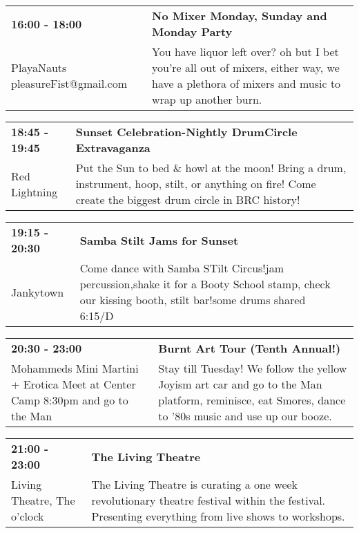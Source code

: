 \begin{tabular}{ p{1in} p{2.2in} }
    \textbf{16:00 - 18:00} & \textbf{No Mixer Monday, Sunday and Monday Party} \\
    PlayaNauts \newline pleasureFist@gmail.com & You have liquor left over? oh but I bet you're all out of mixers, either way, we have a plethora of mixers and music to wrap up another burn. \\
    \hline 
\end{tabular}
    
\begin{tabular}{ p{1in} p{2.2in} }
    \textbf{18:45 - 19:45} & \textbf{Sunset Celebration-Nightly DrumCircle Extravaganza} \\
    Red Lightning \newline  & Put the Sun to bed \& howl at the moon! Bring a drum, instrument, hoop, stilt, or anything on fire! Come create the biggest drum circle in BRC history! \\
    \hline 
\end{tabular}
    
\begin{tabular}{ p{1in} p{2.2in} }
    \textbf{19:15 - 20:30} & \textbf{Samba Stilt Jams for Sunset} \\
    Jankytown \newline  & Come dance with Samba STilt Circus!jam percussion,shake it for a Booty School stamp, check our kissing booth, stilt bar!some drums shared~ 6:15/D \\
    \hline 
\end{tabular}
    
\begin{tabular}{ p{1in} p{2.2in} }
    \textbf{20:30 - 23:00} & \textbf{Burnt Art Tour (Tenth Annual!)} \\
    Mohammeds Mini Martini + Erotica \newline Meet at Center Camp 8:30pm and go to the Man & Stay till Tuesday! We follow the yellow Joyism art car and go to the Man platform, reminisce, eat Smores, dance to '80s music and use up our booze. \\
    \hline 
\end{tabular}
    
\begin{tabular}{ p{1in} p{2.2in} }
    \textbf{21:00 - 23:00} & \textbf{The Living Theatre} \\
    Living Theatre, The \newline 6 o'clock & The Living Theatre is curating a one week revolutionary theatre festival within the festival. Presenting everything from live shows to workshops. \\
    \hline 
\end{tabular}
    
